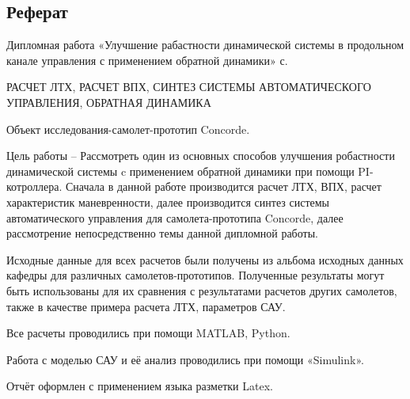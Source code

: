 
\newpage
\begin{center}
    \section*{Реферат}
\end{center}

Дипломная работа «Улучшение рабастности динамической системы в продольном канале управления с применением обратной динамики» \pageref{LastPage} с.

РАСЧЕТ ЛТХ, РАСЧЕТ ВПХ, СИНТЕЗ СИСТЕМЫ АВТОМАТИЧЕСКОГО
УПРАВЛЕНИЯ, ОБРАТНАЯ ДИНАМИКА

Объект исследования-самолет-прототип Concorde.

Цель работы -- Рассмотреть один из основных способов улучшения робастности динамической системы c применением обратной динамики при помощи PI-котроллера. Сначала в данной работе производится расчет ЛТХ, ВПХ, расчет
характеристик маневренности, далее производится синтез системы
автоматического управления для самолета-прототипа Concorde, далее
рассмотрение непосредственно темы данной дипломной работы.

Исходные данные для всех расчетов были получены из альбома исходных
данных кафедры для различных самолетов-прототипов.
Полученные результаты могут быть использованы для их сравнения с
результатами расчетов других самолетов, также в качестве примера расчета
ЛТХ, параметров САУ.

Все расчеты проводились при помощи MATLAB, Python. 

Работа с моделью САУ и её анализ проводились при помощи «Simulink». 

Отчёт оформлен с применением языка разметки Latex.
 